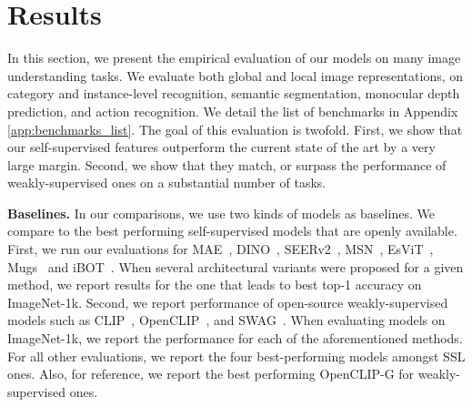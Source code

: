 \section{Results}

\label{sec:results}
In this section, we present the empirical evaluation of our models on many image understanding tasks. We evaluate both global and local image representations, on category and instance-level recognition, semantic segmentation, monocular depth prediction, and action recognition. We detail the list of benchmarks in Appendix \ref{app:benchmarks_list}.
The goal of this evaluation is twofold. First, we show that our self-supervised features outperform the current state of the art by a very large margin. Second, we show that they match, or surpass the performance of weakly-supervised ones on a substantial number of tasks.

\textbf{Baselines.} 
In our comparisons, we use two kinds of models as baselines. We compare to the best performing self-supervised models that are openly available. First, we run our evaluations for MAE~\citep{he2021masked}, DINO~\citep{caron2021emerging}, SEERv2~\citep{goyal2022vision}, MSN~\citep{assran2022masked}, EsViT~\citep{li2021efficient}, Mugs~\citep{zhou2022mugs} and iBOT~\citep{zhou2021ibot}. When several architectural variants were proposed for a given method, we report results for the one that leads to best top-1 accuracy on ImageNet-1k. Second, we report performance of open-source weakly-supervised models such as CLIP~\citep{radford2021learning}, OpenCLIP~\citep{ilharco_gabriel_2021_5143773, cherti2023reproducible}, and SWAG~\citep{singh2022revisiting}. When evaluating models on ImageNet-1k, we report the performance for each of the aforementioned methods. For all other evaluations, we report the four best-performing models amongst SSL ones. Also, for reference, we report the best performing OpenCLIP-G for weakly-supervised ones.

